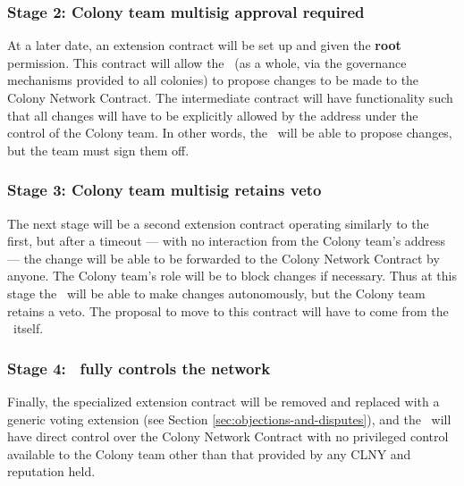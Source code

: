 \subsubsection*{Stage 2: Colony team multisig approval required}
At a later date, an extension contract will be set up and given the \textbf{root} permission. This contract will allow the \rc\ (as a whole, via the governance mechanisms provided to all colonies) to propose changes to be made to the Colony Network Contract. The intermediate contract will have functionality such that all changes will have to be explicitly allowed by the address under the control of the Colony team. In other words, the \rc\ will be able to propose changes, but the team must sign them off.

\subsubsection*{Stage 3: Colony team multisig retains veto}
The next stage will be a second extension contract operating similarly to the first, but after a timeout --- with no interaction from the Colony team's address --- the change will be able to be forwarded to the Colony Network Contract by anyone. The Colony team's role will be to block changes if necessary. Thus at this stage the \rc\ will be able to make changes autonomously, but the Colony team retains a veto.  The proposal to move to this contract will have to come from the \rc\ itself.

\subsubsection*{Stage 4: \rc\ fully controls the network}
Finally, the specialized extension contract will be removed and replaced with a generic voting extension (see Section \ref{sec:objections-and-disputes}), and the \rc\ will have direct control over the Colony Network Contract with no privileged control available to the Colony team other than that provided by any CLNY and reputation held.

